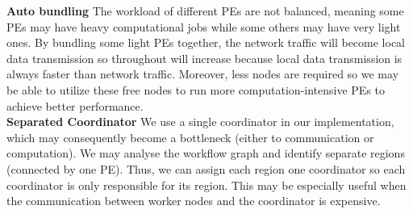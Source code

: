 \textbf{Auto bundling}\quad
The workload of different PEs are not balanced, meaning some PEs may have heavy computational jobs while some others may have very light ones. By bundling some light PEs together, the network traffic will become local data transmission so throughout will increase because local data transmission is always faster than network traffic. Moreover, less nodes are required so we may be able to utilize these free nodes to run more computation-intensive PEs to achieve better performance. \\

\textbf{Separated Coordinator}\quad
We use a single coordinator in our implementation, which may consequently become a bottleneck (either to communication or computation). We may analyse the workflow graph and identify separate regions (connected by one PE). Thus, we can assign each region one coordinator so each coordinator is only responsible for its region. This may be especially useful when the communication between worker nodes and the coordinator is expensive.

